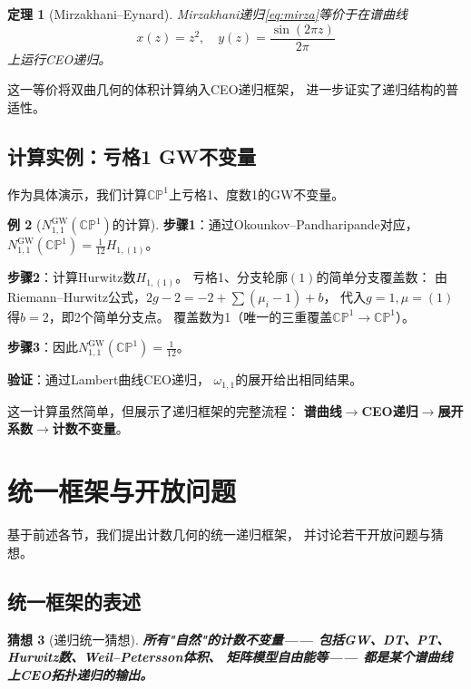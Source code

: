 \documentclass[11pt,a4paper]{article}
\theoremstyle{plain}
\newtheorem{theorem}{定理}[section]
\newtheorem{conjecture}[theorem]{猜想}
\theoremstyle{definition}
\newtheorem{example}[theorem]{例}
\newcommand{\CP}{\mathbb{CP}}
\newcommand{\GWinv}{N^{\mathrm{GW}}}
\begin{document}
\begin{theorem}[Mirzakhani--Eynard]\label{thm:mirzaEO}
Mirzakhani递归\eqref{eq:mirza}等价于在谱曲线
\[
x(z) = z^2, \quad y(z) = \frac{\sin(2\pi z)}{2\pi}
\]
上运行CEO递归。
\end{theorem}

这一等价将双曲几何的体积计算纳入CEO递归框架，
进一步证实了递归结构的普适性。

\subsection{计算实例：亏格1 GW不变量}

作为具体演示，我们计算$\CP^1$上亏格1、度数1的GW不变量。

\begin{example}[$\GWinv_{1, 1}(\CP^1)$的计算]\label{ex:gw11}
\textbf{步骤1}：通过Okounkov--Pandharipande对应，
$\GWinv_{1, 1}(\CP^1) = \frac{1}{12} H_{1, (1)}$。

\textbf{步骤2}：计算Hurwitz数$H_{1, (1)}$。
亏格1、分支轮廓$(1)$的简单分支覆盖数：
由Riemann--Hurwitz公式，$2g-2 = -2 + \sum (\mu_i - 1) + b$，
代入$g=1, \mu=(1)$得$b = 2$，即2个简单分支点。
覆盖数为1（唯一的三重覆盖$\CP^1 \to \CP^1$）。

\textbf{步骤3}：因此$\GWinv_{1, 1}(\CP^1) = \frac{1}{12}$。

\textbf{验证}：通过Lambert曲线CEO递归，
$\omega_{1,1}$的展开给出相同结果。
\end{example}

这一计算虽然简单，但展示了递归框架的完整流程：
\textbf{谱曲线$\to$CEO递归$\to$展开系数$\to$计数不变量}。




\section{统一框架与开放问题}\label{sec:unified}

基于前述各节，我们提出计数几何的统一递归框架，
并讨论若干开放问题与猜想。

\subsection{统一框架的表述}

\begin{conjecture}[递归统一猜想]\label{conj:unified}
\textbf{所有"自然"的计数不变量——
包括GW、DT、PT、Hurwitz数、Weil--Petersson体积、
矩阵模型自由能等——
都是某个谱曲线上CEO拓扑递归的输出。}
\end{conjecture}
\end{document}
